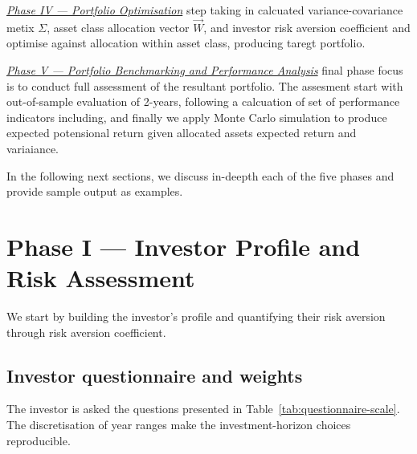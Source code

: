 \documentclass[11pt,a4paper]{article}
\begin{document}
\textit{\hyperref[sec:phase-four]{Phase IV --- Portfolio Optimisation}} step taking in calcuated variance-covariance metix $\Sigma$, asset class allocation vector $\vec{W}$, and investor risk aversion coefficient and optimise against allocation within asset class, producing taregt portfolio.

\textit{\hyperref[sec:phase-one]{Phase V --- Portfolio Benchmarking and Performance Analysis}} final phase focus is to conduct full assessment of the resultant portfolio. The assesment start with out-of-sample evaluation of 2-years, following a calcuation of set of performance indicators including, and finally we apply Monte Carlo simulation to produce expected potensional return given allocated assets expected return and variaiance.

In the following next sections, we discuss in-deepth each of the five phases and provide sample output as examples.

\section{Phase I --- Investor Profile and Risk Assessment}
\label{sec:phase-one}

We start by building the investor's profile and quantifying their risk aversion through risk aversion coefficient.

\subsection{Investor questionnaire and weights}

The investor is asked the questions presented in Table~\ref{tab:questionnaire-scale}. The discretisation of year ranges make the investment-horizon choices reproducible.
\end{document}
